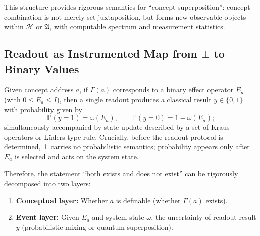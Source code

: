This structure provides rigorous semantics for ``concept superposition'': concept combination is not merely set juxtaposition, but forms new observable objects within $\mathcal{H}$ or $\mathfrak{A}$, with computable spectrum and measurement statistics.

\subsection{Readout as Instrumented Map from $\bot$ to Binary Values}

Given concept address $a$, if $\Gamma(a)$ corresponds to a binary effect operator $E_a$ (with $0\le E_a\le I$), then a single readout produces a classical result $y\in\{0,1\}$ with probability given by
\[
\mathbb{P}(y=1)=\omega(E_a),\qquad \mathbb{P}(y=0)=1-\omega(E_a);
\]
simultaneously accompanied by state update described by a set of Kraus operators or Lüders-type rule. Crucially, before the readout protocol is determined, $\bot$ carries no probabilistic semantics; probability appears only after $E_a$ is selected and acts on the system state.

Therefore, the statement ``both exists and does not exist'' can be rigorously decomposed into two layers:
\begin{enumerate}
  \item \textbf{Conceptual layer:} Whether $a$ is definable (whether $\Gamma(a)$ exists).
  \item \textbf{Event layer:} Given $E_a$ and system state $\omega$, the uncertainty of readout result $y$ (probabilistic mixing or quantum superposition).
\end{enumerate}
